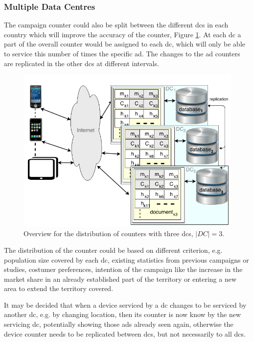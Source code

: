 \subsubsection{Multiple Data Centres}
The campaign counter could also be split between the different \glspl{dc} in each country which will improve the accuracy of the counter, Figure \ref{fig:ads_countert_}. At each \gls{dc} a part of the overall counter would be assigned to each \gls{dc}, which will only be able to service this number of times the specific ad. The changes to the ad counters are replicated in the other \glspl{dc} at different intervals.
\begin{figure}[ht!]
	\centering
	\includegraphics[width=1\linewidth]{figures/AdsServiceSpread2DCs.png}

	\caption{Overview for the distribution of counters with three \glspl{dc}, $|DC| = 3$.}
	\label{fig:ads_countert_}
\end{figure}

The distribution of the counter could be based on different criterion, e.g. population size covered by each \gls{dc}, existing statistics from previous campaigns or studies, costumer preferences, intention of the campaign like the increase in the market share in an already established part of the territory or entering a new area to extend the territory covered.

It may be decided that when a device serviced by a \gls{dc} changes to be serviced by another \gls{dc}, e.g. by changing location, then its counter is now know by the new servicing \gls{dc}, potentially showing those ads already seen again, otherwise the device counter needs to be replicated between \glspl{dc}, but not necessarily to all \glspl{dc}.

